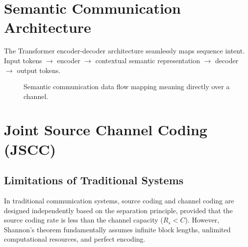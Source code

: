 \documentclass[10pt, conference]{IEEEtran}
\begin{document}
\section{\large \textbf{Semantic Communication Architecture}}
The Transformer encoder-decoder architecture seamlessly maps sequence intent. Input tokens $\rightarrow$ encoder $\rightarrow$ contextual semantic representation $\rightarrow$ decoder $\rightarrow$ output tokens.

\begin{figure}[h]
\centering
{}
\caption{Semantic communication data flow mapping meaning directly over a channel.}
\label{fig:semantic_comm_flow}
\end{figure}
\section{\large \textbf{Joint Source Channel Coding (JSCC)}}

\subsection{\textbf{Limitations of Traditional Systems}}
In traditional communication systems, source coding and channel coding are designed independently based on the separation principle, provided that the source coding rate is less than the channel capacity ($R_s < C$). However, Shannon's theorem fundamentally assumes infinite block lengths, unlimited computational resources, and perfect encoding. 
\end{document}
